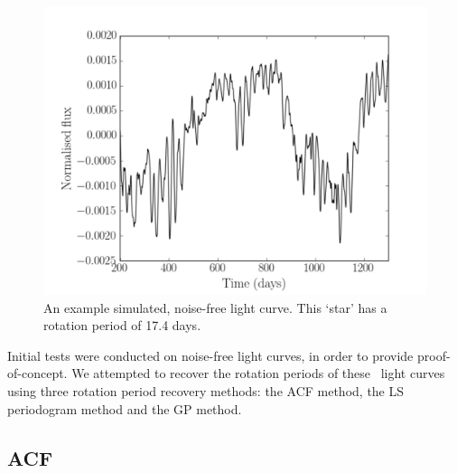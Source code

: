 
\begin{figure}
\begin{center}
\includegraphics[width=6in, clip=true]{figures/thesis_plot.pdf}
\caption[A simulated light curve.]
{An example simulated, noise-free light curve. This `star' has a
rotation period of 17.4 days.}
\label{fig:noise-free_lc}
\end{center}
\end{figure}

Initial tests were conducted on noise-free light curves, in order to provide
proof-of-concept.
We attempted to recover the rotation periods of these \nlightcurves\ light
curves
using three rotation period recovery methods: the ACF method, the LS
periodogram method and the GP method.

\subsection{ACF}

